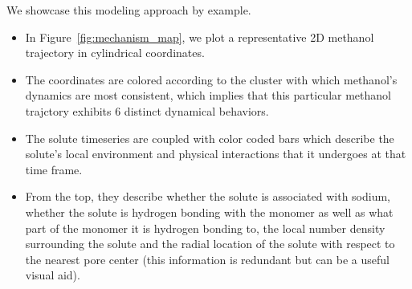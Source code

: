 \documentclass{article}
\begin{document}
  
  We showcase this modeling approach by example. 
  \begin{itemize}
    \item In Figure~\ref{fig:mechanism_map}, we plot a representative 2D methanol 
    trajectory in cylindrical coordinates.
    \item The coordinates are colored according to the cluster with which methanol's
    dynamics are most consistent, which implies that this particular methanol 
    trajctory exhibits 6 distinct dynamical behaviors. 
    \item The solute timeseries are coupled with color coded bars which describe the
    solute's local environment and physical interactions that it undergoes at that
    time frame.
    \item From the top, they describe whether the solute is associated with sodium,
    whether the solute is hydrogen bonding with the monomer as well as what part of
    the monomer it is hydrogen bonding to, the local number density surrounding the
    solute and the radial location of the solute with respect to the nearest pore
    center (this information is redundant but can be a useful visual aid). %
  \end{itemize}
  
\end{document}
